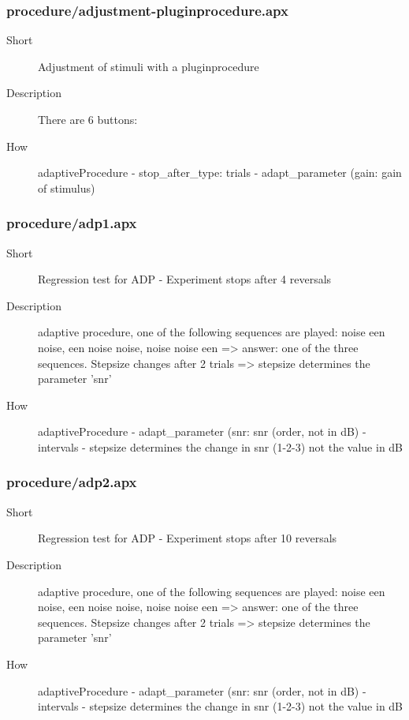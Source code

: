 \subsubsection{procedure/adjustment-pluginprocedure.apx}
\begin{description}
\item[Short] 
 Adjustment of stimuli with a pluginprocedure
\item[Description] 
 There are 6 buttons:
\item[How] 
 adaptiveProcedure - stop\_after\_type: trials - adapt\_parameter (gain: gain of stimulus)
\end{description}

\subsubsection{procedure/adp1.apx}
\begin{description}
\item[Short] 
 Regression test for ADP - Experiment stops after 4 reversals
\item[Description] 
 adaptive procedure, one of the following sequences are played: noise een noise, een noise noise, noise noise een =\textgreater{} answer: one of the three sequences. Stepsize changes after 2 trials =\textgreater{} stepsize determines the parameter 'snr'
\item[How] 
 adaptiveProcedure - adapt\_parameter (snr: snr (order, not in dB) - intervals - stepsize determines the change in snr (1-2-3) not the value in dB
\end{description}

\subsubsection{procedure/adp2.apx}
\begin{description}
\item[Short] 
 Regression test for ADP - Experiment stops after 10 reversals
\item[Description] 
 adaptive procedure, one of the following sequences are played: noise een noise, een noise noise, noise noise een =\textgreater{} answer: one of the three sequences. Stepsize changes after 2 trials =\textgreater{} stepsize determines the parameter 'snr'
\item[How] 
 adaptiveProcedure - adapt\_parameter (snr: snr (order, not in dB) - intervals - stepsize determines the change in snr (1-2-3) not the value in dB
\end{description}

